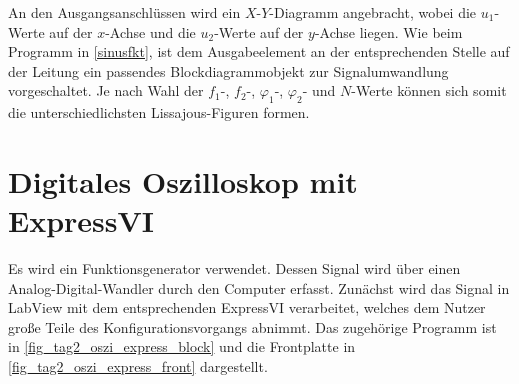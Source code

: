 \documentclass[
a4paper,
12pt,
pagesize,
ngerman
]{scrartcl}
\begin{document}
	\noindent An den Ausgangsanschlüssen wird ein $X$-$Y$-Diagramm angebracht, wobei die $u_1$-Werte auf der $x$-Achse und die $u_2$-Werte auf der $y$-Achse liegen. Wie beim Programm in \cref{sinusfkt}, ist dem Ausgabeelement an der entsprechenden Stelle auf der Leitung ein passendes Blockdiagrammobjekt zur Signalumwandlung vorgeschaltet. Je nach Wahl der $f_1$-, $f_2$-, $\varphi_1$-, $\varphi_2$- und $N$-Werte können sich somit die unterschiedlichsten Lissajous-Figuren formen.
	
	\newpage
	
	
	\section{Digitales Oszilloskop mit ExpressVI}
	Es wird ein Funktionsgenerator verwendet.
	Dessen Signal wird über einen Analog-Digital-Wandler durch den Computer erfasst.
	Zunächst wird das Signal in LabView mit dem entsprechenden ExpressVI verarbeitet, welches dem Nutzer große Teile des Konfigurationsvorgangs abnimmt.
	Das zugehörige Programm ist in \cref{fig_tag2_oszi_express_block} und die Frontplatte in \cref{fig_tag2_oszi_express_front} dargestellt.
	
\end{document}
